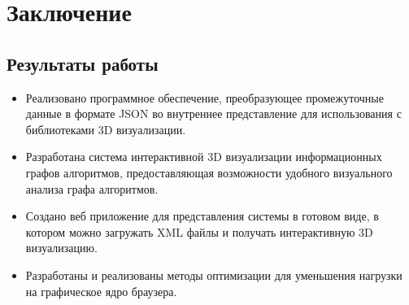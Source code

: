 \section{Заключение}
\label{sec:Chapter5} 

\subsection{Результаты работы}
\begin{itemize}
    \item Реализовано программное обеспечение, преобразующее промежуточные данные в формате JSON во внутреннее представление для использования с библиотеками 3D визуализации. 
    \item Разработана система интерактивной 3D визуализации информационных графов алгоритмов, предоставляющая возможности удобного визуального анализа графа алгоритмов. 
    \item Создано веб приложение для представления системы в готовом виде, в котором можно загружать XML файлы и получать интерактивную 3D визуализацию.
    \item Разработаны и реализованы методы оптимизации для уменьшения нагрузки на графическое ядро браузера.
\end{itemize}


